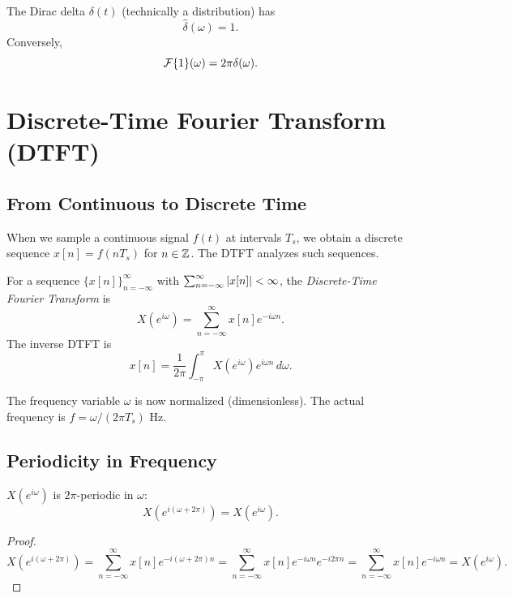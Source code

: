 \begin{notechapter}
\begin{example}
The Dirac delta $\delta(t)$ (technically a distribution) has
\[
\hat{\delta}(\omega) = 1.
\]
Conversely,
\[
\mathcal{F}\{1\}(\omega) = 2\pi \delta(\omega).
\]
\end{example}

\section{Discrete-Time Fourier Transform (DTFT)}

\subsection{From Continuous to Discrete Time}

When we sample a continuous signal $f(t)$ at intervals $T_s$, we obtain a discrete sequence $x[n] = f(nT_s)$ for $n \in \mathbb{Z}$. The DTFT analyzes such sequences.

\begin{definition}[DTFT]
For a sequence $\{x[n]\}_{n=-\infty}^{\infty}$ with $\sum_{n=-\infty}^{\infty} \left|x[n]\right| < \infty$, the \emph{Discrete-Time Fourier Transform} is
\[
X(e^{i\omega}) = \sum_{n=-\infty}^{\infty} x[n] e^{-i\omega n}.
\]
The inverse DTFT is
\[
x[n] = \frac{1}{2\pi} \int_{-\pi}^{\pi} X(e^{i\omega}) e^{i\omega n} \, d\omega.
\]
\end{definition}

\begin{remark}
The frequency variable $\omega$ is now normalized (dimensionless). The actual frequency is $f = \omega/(2\pi T_s)$ Hz.
\end{remark}

\subsection{Periodicity in Frequency}

\begin{proposition}
$X(e^{i\omega})$ is $2\pi$-periodic in $\omega$:
\[
X(e^{i(\omega + 2\pi)}) = X(e^{i\omega}).
\]
\end{proposition}

\begin{proof}
\[
X(e^{i(\omega + 2\pi)}) = \sum_{n=-\infty}^{\infty} x[n] e^{-i(\omega + 2\pi)n} = \sum_{n=-\infty}^{\infty} x[n] e^{-i\omega n} e^{-i 2\pi n} = \sum_{n=-\infty}^{\infty} x[n] e^{-i\omega n} = X(e^{i\omega}).
\]
\end{proof}


\end{notechapter}
